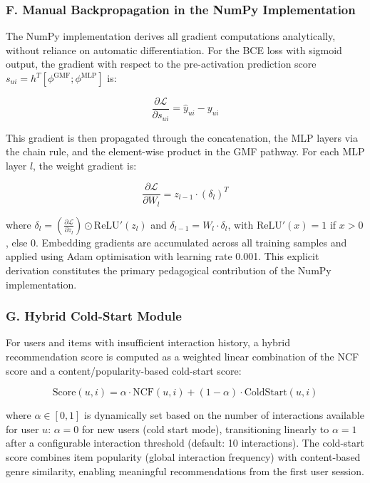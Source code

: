 \documentclass[
]{IEEEtran}
\begin{document}
\subsubsection{F. Manual Backpropagation in the NumPy
Implementation}\label{f.-manual-backpropagation-in-the-numpy-implementation}

The NumPy implementation derives all gradient computations analytically,
without reliance on automatic differentiation. For the BCE loss with
sigmoid output, the gradient with respect to the pre-activation
prediction score
\(s_{ui} = h^T [\phi^{\text{GMF}} ; \phi^{\text{MLP}}]\) is:

\[\frac{\partial \mathcal{L}}{\partial s_{ui}} = \hat{y}_{ui} - y_{ui}\]

This gradient is then propagated through the concatenation, the MLP
layers via the chain rule, and the element-wise product in the GMF
pathway. For each MLP layer \(l\), the weight gradient is:

\[\frac{\partial \mathcal{L}}{\partial W_l} = z_{l-1} \cdot (\delta_l)^T\]

where
\(\delta_l = \left(\frac{\partial \mathcal{L}}{\partial z_l}\right) \odot \text{ReLU}'(z_l)\)
and \(\delta_{l-1} = W_l \cdot \delta_l\), with \(\text{ReLU}'(x) = 1\)
if \(x > 0\), else \(0\). Embedding gradients are accumulated across all
training samples and applied using Adam optimisation with learning rate
0.001. This explicit derivation constitutes the primary pedagogical
contribution of the NumPy implementation.

\subsubsection{G. Hybrid Cold-Start
Module}\label{g.-hybrid-cold-start-module}

For users and items with insufficient interaction history, a hybrid
recommendation score is computed as a weighted linear combination of the
NCF score and a content/popularity-based cold-start score:

\[\text{Score}(u,i) = \alpha \cdot \text{NCF}(u,i) + (1-\alpha) \cdot \text{ColdStart}(u,i)\]

where \(\alpha \in [0,1]\) is dynamically set based on the number of
interactions available for user \(u\): \(\alpha = 0\) for new users
(cold start mode), transitioning linearly to \(\alpha = 1\) after a
configurable interaction threshold (default: 10 interactions). The
cold-start score combines item popularity (global interaction frequency)
with content-based genre similarity, enabling meaningful recommendations
from the first user session.
\end{document}
